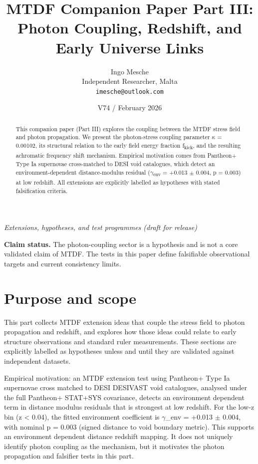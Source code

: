 \documentclass[11pt,a4paper]{article}
\title{MTDF Companion Paper Part III: Photon Coupling, Redshift, and Early Universe Links}
\author{Ingo Mesche\\ \small Independent Researcher, Malta \\ \small \texttt{imesche@outlook.com}}
\date{V74 / February 2026}
\begin{document}
\maketitle
\begin{center}\itshape Extensions, hypotheses, and test programmes (draft for release)\end{center}



\tableofcontents

\begin{abstract}
This companion paper (Part III) explores the coupling between the MTDF stress field and photon propagation. We present the photon-stress coupling parameter $\kappa$ = 0.00102, its structural relation to the early field energy fraction f\textsubscript{kick}, and the resulting achromatic frequency shift mechanism. Empirical motivation comes from Pantheon+ Type Ia supernovae cross-matched to DESI void catalogues, which detect an environment-dependent distance-modulus residual ($\gamma$\textsubscript{env} = +0.013 $\pm$ 0.004, p = 0.003) at low redshift. All extensions are explicitly labelled as hypotheses with stated falsification criteria.
\end{abstract}

\begin{mdframed}[linecolor=accent,linewidth=0.5pt,backgroundcolor=callout-bg,leftline=true,rightline=true,topline=true,bottomline=true,innerleftmargin=8pt,innerrightmargin=8pt,innertopmargin=6pt,innerbottommargin=6pt]
\textbf{Claim status.}
The photon-coupling sector is a hypothesis and is not a core validated claim of MTDF. The tests in this paper define falsifiable observational targets and current consistency limits.
\end{mdframed}


\section{Purpose and scope}
\label{sec:purpose}
This part collects MTDF extension ideas that couple the stress field to photon propagation and redshift, and explores how those ideas could relate to early structure observations and standard ruler measurements.
These sections are explicitly labelled as hypotheses unless and until they are validated against independent datasets.

Empirical motivation: an MTDF extension test using Pantheon+ Type Ia supernovae cross matched to DESI DESIVAST void catalogues, analysed under the full Pantheon+ STAT+SYS covariance, detects an environment dependent term in distance modulus residuals that is strongest at low redshift. For the low-z bin (z < 0.04), the fitted environment coefficient is $\gamma$\_\allowbreak{}env = +0.013 $\pm$ 0.004, with nominal p = 0.003 (signed distance to void boundary metric). This supports an environment dependent distance redshift mapping. It does not uniquely identify photon coupling as the mechanism, but it motivates the photon propagation and falsifier tests in this part.
\end{document}
